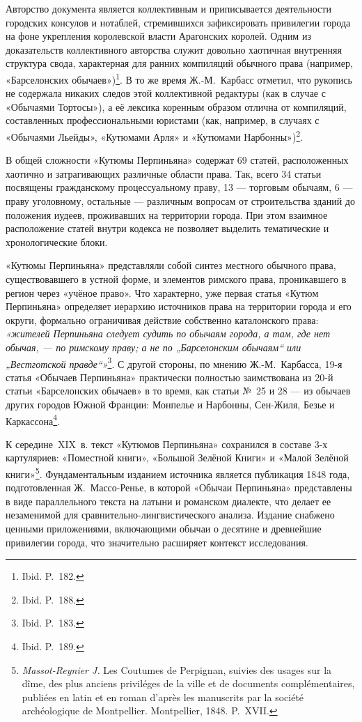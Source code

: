 Авторство документа является коллективным и приписывается деятельности городских консулов и нотаблей, стремившихся зафиксировать привилегии города на фоне укрепления королевской власти Арагонских королей. Одним из доказательств коллективного авторства служит довольно хаотичная внутренняя структура свода, характерная для ранних компиляций обычного права (например, «Барселонских обычаев»)\footnote{Ibid. P.~182.}. В то же время Ж.-М.~Карбасс отметил, что рукопись не содержала никаких следов этой коллективной редактуры (как в случае с «Обычаями Тортосы»), а её лексика коренным образом отлична от компиляций, составленных профессиональными юристами (как, например, в случаях с «Обычаями Льейды», «Кутюмами Арля» и «Кутюмами Нарбонны»)\footnote{Ibid. P.~188.}.

В общей сложности «Кутюмы Перпиньяна» содержат 69 статей, расположенных хаотично и затрагивающих различные области права. Так, всего 34 статьи посвящены гражданскому процессуальному праву, 13 --- торговым обычаям, 6 --- праву уголовному, остальные --- различным вопросам от строительства зданий до положения иудеев, проживавших на территории города. При этом взаимное расположение статей внутри кодекса не позволяет выделить тематические и хронологические блоки.

«Кутюмы Перпиньяна» представляли собой синтез местного обычного права, существовавшего в устной форме, и элементов римского права, проникавшего в регион через «учёное право». Что характерно, уже первая статья «Кутюм Перпиньяна» определяет иерархию источников права на территории города и его округи, формально ограничивая действие собственно каталонского права: \emph{«жителей Перпиньяна следует судить по обычаям города, а там, где нет обычая, --- по римскому праву; а не по „Барселонским обычаям“ или „Вестготской правде“»}\footnote{Ibid. P.~183.}. С другой стороны, по мнению Ж.-М.~Карбасса, 19-я статья «Обычаев Перпиньяна» практически полностью заимствована из 20-й статьи «Барселонских обычаев» в то время, как статьи №~25 и 28 --- из обычаев других городов Южной Франции: Монпелье и Нарбонны, Сен-Жиля, Безье и Каркассона\footnote{Ibid. P.~189.}.

К середине~XIX~в. текст «Кутюмов Перпиньяна» сохранился в составе 3-х картуляриев: «Поместной книги», «Большой Зелёной Книги» и «Малой Зелёной книги»\footnote{\emph{Massot-Reynier J. }Les Coutumes de Perpignan, suivies des usages sur la dîme, des plus anciens priviléges de la ville et de documents complémentaires, publiées en latin et en roman d’après les manuscrits par la société archéologique de Montpellier. Montpellier, 1848. P.~XVII.}. Фундаментальным изданием источника является публикация 1848 года, подготовленная Ж.~Массо-Ренье, в которой «Обычаи Перпиньяна» представлены в виде параллельного текста на латыни и романском диалекте, что делает ее незаменимой для сравнительно-лингвистического анализа. Издание снабжено ценными приложениями, включающими обычаи о десятине и древнейшие привилегии города, что значительно расширяет контекст исследования.

